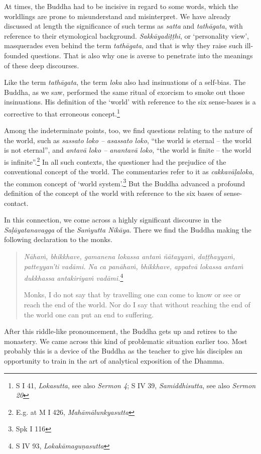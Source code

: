 At times, the Buddha had to be incisive in regard to some words, which the worldlings are prone to misunderstand and misinterpret. We have already discussed at length the significance of such terms as \emph{satta} and \emph{tathāgata}, with reference to their etymological background. \emph{Sakkāyadiṭṭhi}, or `personality view', masquerades even behind the term \emph{tathāgata}, and that is why they raise such ill-founded questions. That is also why one is averse to penetrate into the meanings of these deep discourses.

Like the term \emph{tathāgata}, the term \emph{loka} also had insinuations of a self-bias. The Buddha, as we saw, performed the same ritual of exorcism to smoke out those insinuations. His definition of the `world' with reference to the six sense-bases is a corrective to that erroneous concept.\footnote{S I 41, \emph{Lokasutta}, see also \emph{Sermon 4}; S IV 39, \emph{Samiddhisutta}, see also \emph{Sermon 20}}

Among the indeterminate points, too, we find questions relating to the nature of the world, such as \emph{sassato loko -- asassato loko}, ``the world is eternal -- the world is not eternal'', and \emph{antavā loko -- anantavā loko}, ``the world is finite -- the world is infinite''.\footnote{E.g. at M I 426, \emph{Mahāmālunkyasutta}} In all such contexts, the questioner had the prejudice of the conventional concept of the world. The commentaries refer to it as \emph{cakkavāḷaloka}, the common concept of `world system'.\footnote{Spk I 116} But the Buddha advanced a profound definition of the concept of the world with reference to the six bases of sense-contact.

In this connection, we come across a highly significant discourse in the \emph{Saḷāyatanavagga} of the \emph{Saṁyutta Nikāya}. There we find the Buddha making the following declaration to the monks.

\begin{quote}
\emph{Nāhaṁ, bhikkhave, gamanena lokassa antaṁ ñātayyaṁ, daṭṭhayyaṁ, patteyyan'ti vadāmi. Na ca panāhaṁ, bhikkhave, appatvā lokassa antaṁ dukkhassa antakiriyaṁ vadāmi.}\footnote{S IV 93, \emph{Lokakāmaguṇasutta}}

Monks, I do not say that by travelling one can come to know or see or reach the end of the world. Nor do I say that without reaching the end of the world one can put an end to suffering.
\end{quote}

After this riddle-like pronouncement, the Buddha gets up and retires to the monastery. We came across this kind of problematic situation earlier too. Most probably this is a device of the Buddha as the teacher to give his disciples an opportunity to train in the art of analytical exposition of the Dhamma.

